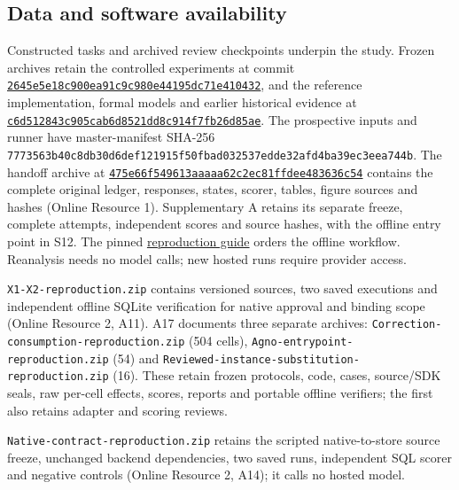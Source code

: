 \documentclass[pdflatex,sn-basic]{sn-jnl}
\begin{document}
\subsection*{Data and software availability}
Constructed tasks and archived review checkpoints underpin the study. Frozen archives retain the controlled experiments at commit \href{https://github.com/lhh666-6/auto-dete/tree/2645e5e18c900ea91c9c980e44195dc71e410432/DKE-supplement}{\nolinkurl{2645e5e18c900ea91c9c980e44195dc71e410432}}, and the reference implementation, formal models and earlier historical evidence at \href{https://github.com/lhh666-6/auto-dete/tree/c6d512843c905cab6d8521dd8c914f7fb26d85ae/latest}{\nolinkurl{c6d512843c905cab6d8521dd8c914f7fb26d85ae}}. The prospective inputs and runner have master-manifest SHA-256 \nolinkurl{7773563b40c8db30d6def121915f50fbad032537edde32afd4ba39ec3eea744b}. The handoff archive at \href{https://github.com/lhh666-6/auto-dete/tree/475e66f549613aaaaa62c2ec81ffdee483636c54/cloud-handoff}{\nolinkurl{475e66f549613aaaaa62c2ec81ffdee483636c54}} contains the complete original ledger, responses, states, scorer, tables, figure sources and hashes (Online Resource 1). Supplementary A retains its separate freeze, complete attempts, independent scores and source hashes, with the offline entry point in S12. The pinned \href{https://github.com/lhh666-6/auto-dete/blob/f5fe7231c5e808ba1629132d222f448bff471204/REPRODUCIBILITY.md}{reproduction guide} orders the offline workflow. Reanalysis needs no model calls; new hosted runs require provider access.

{\nolinkurl{X1-X2-reproduction.zip}} contains versioned sources, two saved executions and independent offline SQLite verification for native approval and binding scope (Online Resource 2, A11). A17 documents three separate archives: {\nolinkurl{Correction-consumption-reproduction.zip}} (504 cells), {\nolinkurl{Agno-entrypoint-reproduction.zip}} (54) and {\nolinkurl{Reviewed-instance-substitution-reproduction.zip}} (16). These retain frozen protocols, code, cases, source/SDK seals, raw per-cell effects, scores, reports and portable offline verifiers; the first also retains adapter and scoring reviews.

{\nolinkurl{Native-contract-reproduction.zip}} retains the scripted native-to-store source freeze, unchanged backend dependencies, two saved runs, independent SQL scorer and negative controls (Online Resource 2, A14); it calls no hosted model.
\end{document}
